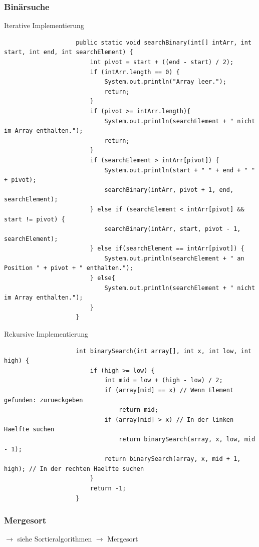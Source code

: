 \documentclass[a4paper, landscape, 8pt]{scrartcl}
\begin{document}
\begin{multicols*}{4}
                \subsubsection{Binärsuche}
                \textcolor{subsectioncolor}{Iterative Implementierung}
                \begin{lstlisting}
                    public static void searchBinary(int[] intArr, int start, int end, int searchElement) {
                        int pivot = start + ((end - start) / 2);
                        if (intArr.length == 0) {
                            System.out.println("Array leer.");
                            return;
                        }
                        if (pivot >= intArr.length){
                            System.out.println(searchElement + " nicht im Array enthalten.");
                            return;
                        }
                        if (searchElement > intArr[pivot]) {
                            System.out.println(start + " " + end + " " + pivot);
                            searchBinary(intArr, pivot + 1, end, searchElement);
                        } else if (searchElement < intArr[pivot] && start != pivot) {
                            searchBinary(intArr, start, pivot - 1, searchElement);
                        } else if(searchElement == intArr[pivot]) {
                            System.out.println(searchElement + " an Position " + pivot + " enthalten.");
                        } else{
                            System.out.println(searchElement + " nicht im Array enthalten.");
                        }
                    }
                \end{lstlisting}
                \textcolor{subsectioncolor}{Rekursive Implementierung}
                \begin{lstlisting}
                    int binarySearch(int array[], int x, int low, int high) {
                        if (high >= low) {
                            int mid = low + (high - low) / 2;
                            if (array[mid] == x) // Wenn Element gefunden: zurueckgeben
                                return mid;
                            if (array[mid] > x) // In der linken Haelfte suchen
                                return binarySearch(array, x, low, mid - 1);
                            return binarySearch(array, x, mid + 1, high); // In der rechten Haelfte suchen
                        }
                        return -1;
                    }
                \end{lstlisting}
                \subsubsection{Mergesort}
                    $\to$ siehe Sortieralgorithmen $\to$ Mergesort

\end{multicols*}
\end{document}
